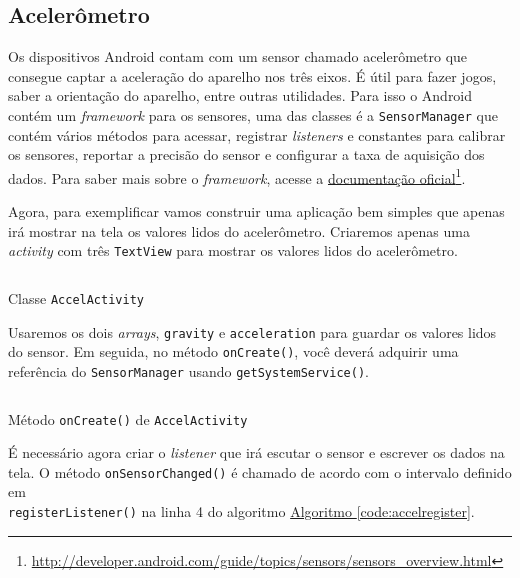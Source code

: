 \documentclass[a4paper,12pt,brazil,oneside]{book}
\begin{document}
\begin{singlespace}
\chapter{Acelerômetro}
	Os dispositivos Android contam com um sensor chamado acelerômetro que consegue captar a aceleração do aparelho nos três eixos. É útil para fazer jogos, saber a orientação do aparelho, entre outras utilidades. Para isso o Android contém um \emph{framework} para os sensores, uma das classes é a \texttt{SensorManager} que contém vários métodos para acessar, registrar \emph{listeners} e constantes para calibrar os sensores, reportar a precisão do sensor e configurar a taxa de aquisição dos dados. Para saber mais sobre o \emph{framework}, acesse a \href{http://developer.android.com/guide/topics/sensors/sensors\_overview.html}{documentação oficial}\footnote{\href{http://developer.android.com/guide/topics/sensors/sensors\_overview.html}{http://developer.android.com/guide/topics/sensors/sensors\_overview.html}}.

	Agora, para exemplificar vamos construir uma aplicação bem simples que apenas irá mostrar na tela os valores lidos do acelerômetro. Criaremos apenas uma \emph{activity} com três \texttt{TextView} para mostrar os valores lidos do acelerômetro.

	\begin{listing}[H]
	\inputminted[linenos=true,fontsize=\small,frame=lines, framesep=2mm, tabsize=2,numbersep=5pt]{java}{src/api/accelerometer/activity.java}
	\caption{Classe \texttt{AccelActivity}}
	\label{code:accelactivity}
	\end{listing} 			

	Usaremos os dois \emph{arrays}, \texttt{gravity} e \texttt{acceleration} para guardar os valores lidos do sensor. Em seguida, no método \texttt{onCreate()}, você deverá adquirir uma referência do \texttt{SensorManager} usando \texttt{getSystemService()}.

	\begin{listing}[H]
	\inputminted[linenos=true,fontsize=\small,frame=lines, framesep=2mm, tabsize=2,numbersep=5pt]{java}{src/api/accelerometer/oncreate.java}
	\caption{Método \texttt{onCreate()} de \texttt{AccelActivity}}
	\label{code:accelactivitycreate}
	\end{listing} 			

	É necessário agora criar o \emph{listener} que irá escutar o sensor e escrever os dados na tela. O método \texttt{onSensorChanged()} é chamado de acordo com o intervalo definido em \\ \texttt{registerListener()} na linha 4 do algoritmo \hyperref[code:accelregister]{Algoritmo \ref*{code:accelregister}}.


\end{singlespace}
\end{document}
